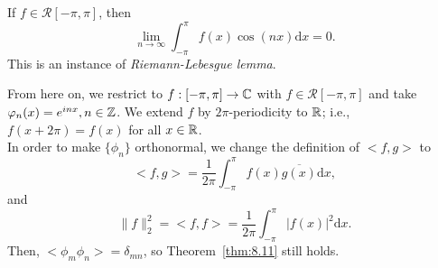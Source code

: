 \begin{example}
	If $f \in \mathscr{R}[-\pi,\pi]$, then
	\[
		\lim_{n\to \infty}{\int_{-\pi}^{\pi}{f(x) \cos{(nx)}\mathrm{d}x}}=0
		.\]
	This is an instance of \textit{Riemann-Lebesgue lemma}.
\end{example}


From here on, we restrict to $f:[-\pi,\pi]\to \mathbb{C}$ with $f \in \mathscr{R}[-\pi,\pi]$ and take $\varphi_n(x)=e^{inx}, n \in \mathbb{Z}$. We extend $f$ by $2\pi$-periodicity to $\mathbb{R}$; i.e., $f(x+2\pi)=f(x)$ for all $x \in \mathbb{R}$.\\
In order to make $\{\phi_n\}$ orthonormal, we change the definition of $<f,g>$ to
\[
	<f,g> = \frac{1}{2\pi} \int_{-\pi}^{\pi}{f(x) \overline{g(x)}\mathrm{d}x}
	,\]
and
\[
	\|f\|_2^2= <f, f> =\frac{1}{2\pi} \int_{-\pi}^{\pi}{\left|f(x)\right|^2\mathrm{d}x}
	.\]
Then, $<\phi_m \phi_n > = \delta_{mn}$, so Theorem~\ref{thm:8.11} still holds.\\


